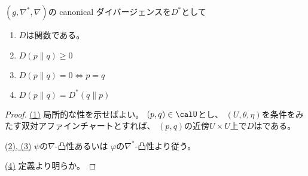 \documentclass[report]{jlreq}
\begin{document}
\begin{proposition}
    $(g, \nabla^*, \nabla)$の canonical ダイバージェンスを$D^*$として
    \begin{enumerate}
        \item $D$は{\smooth}関数である。
        \item $D(p \| q) \ge 0$
        \item $D(p \| q) = 0 \iff p = q$
        \item $D(p \| q) = D^*(q \| p)$
    \end{enumerate}
\end{proposition}

\begin{proof}
    \uline{(1)} \quad
    局所的な{\smooth}性を示せばよい。
    $(p, q) \in \calU$とし、
    $(U, \theta, \eta)$を条件をみたす双対アファインチャートとすれば、
    $(p, q)$の近傍$U \times U$上で$D$は{\smooth}である。

    \uline{(2), (3)} \quad
    $\psi$の$\nabla$-凸性あるいは
    $\varphi$の$\nabla^*$-凸性より従う。

    \uline{(4)} \quad
    定義より明らか。
\end{proof}
\end{document}
